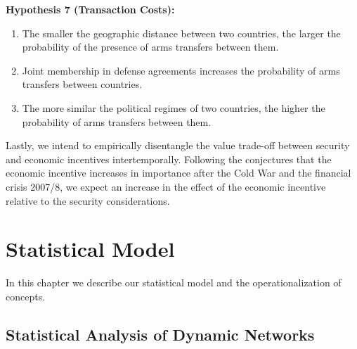 \documentclass[12pt, letterpaper]{article}
\numberwithin{equation}{section}
\begin{document}
\begin{itemize}
\begin{singlespace}
\item[] \textbf{Hypothesis 7 (Transaction Costs):} 
\begin{enumerate}[label=\alph*)]
\item The smaller the geographic distance between two countries, the larger the probability of the presence of arms transfers between them.   
\item Joint membership in defense agreements increases the probability of arms transfers between countries.   
\item The more similar the political regimes of two countries, the higher the probability of arms transfers between them.   
\end{enumerate}
\end{singlespace}
\end{itemize}

Lastly, we intend to empirically disentangle the value trade-off between security and economic incentives intertemporally. Following the conjectures that the economic incentive increases in importance after the Cold War and the financial crisis 2007/8, we expect an increase in the effect of the economic incentive relative to the security considerations.





\section{Statistical Model}\label{statistical_model}
In this chapter we describe our statistical model and the operationalization of concepts. 

 
 \subsection{Statistical Analysis of Dynamic Networks}\label{san} %
 
\end{document}
